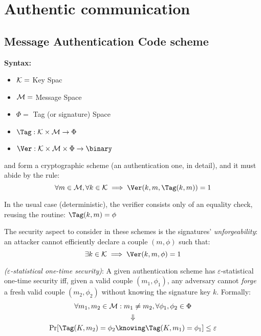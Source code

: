 
\section{Authentic communication}


\subsection{Message Authentication Code scheme}

\textbf{Syntax:}

\begin{itemize}
    \item $\mathcal{K} = $ Key Spac 
    \item $\mathcal{M} = $ Message Space
    \item $\Phi = $ Tag (or signature) Space
    \item $\Tag: \K \times \M \to \Phi$
    \item $\Ver: \K \times \M \times \Phi \to \binary$
\end{itemize}

\Tag{} and \Ver{} form a cryptographic scheme (an authentication one, in detail), and it must abide by the rule:
\[
    \forall m \in \M, \forall k \in \K \implies \Ver(k, m, \Tag(k, m)) = 1
\]

In the usual case (deterministic), the verifier consists only of an equality check, reusing the \Tag{} routine: $\Tag(k, m) = \phi$

The security aspect to consider in these schemes is the signatures' \emph{unforgeability}: an attacker cannot efficiently declare a couple $(m, \phi)$ such that:
\[
    \exists k \in \K \implies \Ver(k, m, \phi) = 1
\]

\begin{definition} \emph{($\varepsilon$-statistical one-time security)}: A given authentication scheme has $\varepsilon$-statistical one-time security iff, given a valid couple $(m_1, \phi_1)$, any adversary cannot \emph{forge} a fresh valid couple $(m_2, \phi_2)$ without knowing the signature key $k$. Formally:
    \begin{gather*}
        \forall m_1, m_2 \in \M : m_1 \neq m_2, \forall \phi_1, \phi_2 \in \Phi \\
        \Downarrow \\
        \Pr[\Tag(K, m_2) = \phi_2 \knowing \Tag(K, m_1) = \phi_1] \leq \varepsilon
    \end{gather*}
    
\end{definition}

